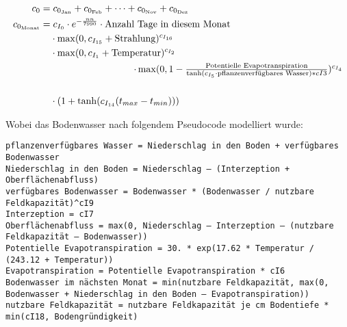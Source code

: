 \documentclass[twocolumn]{scrartcl}
\begin{document}
\begin{align}
  \label{eq:c0Monat}
  c_0 &= c_{0_{\text{Jan}}} + c_{0_{\text{Feb}}} + \cdots + c_{0_{\text{Nov}}} + c_{0_{\text{Dez}}} \\
  c_{0_{\text{Monat}}} &= c_{I_0} \cdot e^{-\frac{nn}{7990}} \cdot \text{Anzahl Tage in diesem Monat} \notag \\
      &\phantom{{}= } \cdot \max(0, c_{I_{15}} + \text{Strahlung})^{c_{I_{16}}} \notag \\
      &\phantom{{}= } \cdot \max(0, c_{I_{1}} + \text{Temperatur})^{c_{I_{2}}} \notag \\
  \noalign{\hfill $\cdot \max(0, 1 - \frac{\text{Potentielle Evapotranspiration}}{\tanh(c_{I_5} \cdot \text{pflanzenverfügbares Wasser}) * cI3})^{c_{I_4}}$} \notag \\
  &\phantom{{}= } \cdot (1 + \tanh(c_{I_{14}} (t_{max}- t_{min})))
\end{align}

Wobei das Bodenwasser nach folgendem Pseudocode modelliert wurde:

  \begin{Verbatim}[breaklines=true,frame=single,fontsize=\scriptsize]
pflanzenverfügbares Wasser = Niederschlag in den Boden + verfügbares Bodenwasser
Niederschlag in den Boden = Niederschlag – (Interzeption + Oberflächenabfluss)
verfügbares Bodenwasser = Bodenwasser * (Bodenwasser / nutzbare Feldkapazität)^cI9
Interzeption = cI7
Oberflächenabfluss = max(0, Niederschlag – Interzeption – (nutzbare Feldkapazität – Bodenwasser))
Potentielle Evapotranspiration = 30. * exp(17.62 * Temperatur / (243.12 + Temperatur))
Evapotranspiration = Potentielle Evapotranspiration * cI6
Bodenwasser im nächsten Monat = min(nutzbare Feldkapazität, max(0, Bodenwasser + Niederschlag in den Boden – Evapotranspiration))
nutzbare Feldkapazität = nutzbare Feldkapazität je cm Bodentiefe * min(cI18, Bodengründigkeit)
\end{Verbatim}
\end{document}
